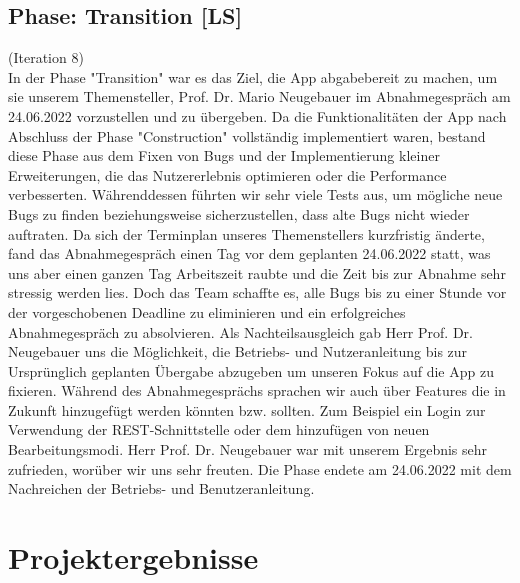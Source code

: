 \documentclass[10pt]{article}
\begin{document}
\subsection{Phase: Transition [LS]}
(Iteration 8) \\
In der Phase "Transition" war es das Ziel, die App abgabebereit zu machen, um sie unserem Themensteller,
Prof. Dr. Mario Neugebauer im Abnahmegespräch am 24.06.2022 vorzustellen
und zu übergeben. Da die Funktionalitäten der App nach Abschluss der Phase "Construction" vollständig implementiert waren,
bestand diese Phase aus dem Fixen von Bugs und der 
Implementierung kleiner Erweiterungen, die das Nutzererlebnis optimieren oder die Performance verbesserten. 
Währenddessen führten wir sehr viele Tests aus, um mögliche neue Bugs
zu finden beziehungsweise sicherzustellen, dass alte Bugs nicht wieder auftraten. 
Da sich der Terminplan unseres Themenstellers kurzfristig änderte, fand das Abnahmegespräch einen
Tag vor dem geplanten 24.06.2022 statt, was uns aber einen ganzen Tag Arbeitszeit raubte 
und die Zeit bis zur Abnahme sehr stressig werden lies. 
Doch das Team schaffte es, alle Bugs bis zu einer Stunde vor der vorgeschobenen Deadline zu eliminieren 
und ein erfolgreiches Abnahmegespräch zu absolvieren. Als Nachteilsausgleich gab
Herr Prof. Dr. Neugebauer uns die Möglichkeit, die Betriebs- und Nutzeranleitung bis zur Ursprünglich geplanten
Übergabe abzugeben um unseren Fokus auf die App zu fixieren.
Während des Abnahmegesprächs sprachen wir auch über Features die in Zukunft hinzugefügt werden könnten bzw. sollten. 
Zum Beispiel ein Login zur Verwendung der REST-Schnittstelle oder dem hinzufügen von neuen Bearbeitungsmodi.
Herr Prof. Dr. Neugebauer war mit unserem Ergebnis sehr zufrieden, worüber wir uns sehr freuten.
Die Phase endete am 24.06.2022 mit dem Nachreichen der Betriebs- und Benutzeranleitung. 

\newpage
\section{Projektergebnisse}
\end{document}
